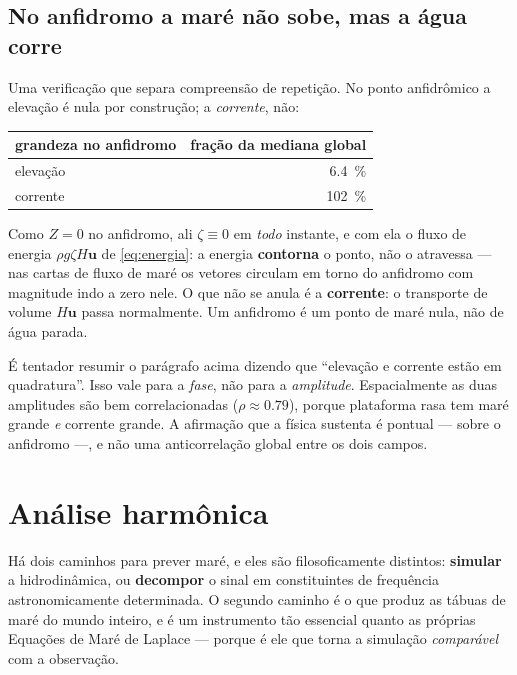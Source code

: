\documentclass[11pt,a4paper,oneside]{report}
\theoremstyle{definition}
\theoremstyle{plain}
\theoremstyle{remark}
\newcommand{\vect}[1]{\bm{#1}}
\begin{document}
\section{No anfidromo a maré não sobe, mas a água corre}

Uma verificação que separa compreensão de repetição. No ponto anfidrômico a
elevação é nula por construção; a \emph{corrente}, não:

\begin{center}
\begin{tabular}{@{}lr@{}}
\toprule
grandeza no anfidromo & fração da mediana global \\
\midrule
elevação & \SI{6.4}{\percent} \\
corrente & \SI{102}{\percent} \\
\bottomrule
\end{tabular}
\end{center}

Como $Z=0$ no anfidromo, ali $\zeta\equiv 0$ em \emph{todo} instante, e com ela
o fluxo de energia $\rho g\zeta H\vect{u}$ de \eqref{eq:energia}: a energia
\textbf{contorna} o ponto, não o atravessa — nas cartas de fluxo de maré os
vetores circulam em torno do anfidromo com magnitude indo a zero nele. O que
não se anula é a \textbf{corrente}: o transporte de volume $H\vect{u}$ passa
normalmente. Um anfidromo é um ponto de maré nula, não de água parada.

\begin{alerta}
É tentador resumir o parágrafo acima dizendo que ``elevação e corrente estão em
quadratura''. Isso vale para a \emph{fase}, não para a \emph{amplitude}.
Espacialmente as duas amplitudes são bem correlacionadas
($\rho\approx\num{0.79}$), porque plataforma rasa tem maré grande \emph{e}
corrente grande. A afirmação que a física sustenta é pontual — sobre o
anfidromo —, e não uma anticorrelação global entre os dois campos.
\end{alerta}

\chapter{Análise harmônica}
\label{cap:harmonica}

Há dois caminhos para prever maré, e eles são filosoficamente distintos:
\textbf{simular} a hidrodinâmica, ou \textbf{decompor} o sinal em constituintes
de frequência astronomicamente determinada. O segundo caminho é o que produz as
tábuas de maré do mundo inteiro, e é um instrumento tão essencial quanto as
próprias Equações de Maré de Laplace — porque é ele que torna a simulação
\emph{comparável} com a observação.
\end{document}
